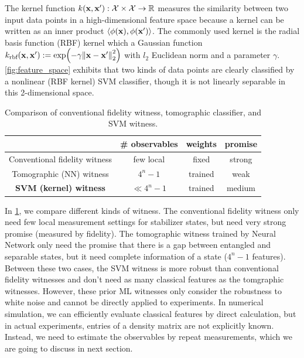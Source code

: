 \documentclass[
aps,
pra,
twocolumn,
floatfix,
]{revtex4-2}
\theoremstyle{plain}
\theoremstyle{definition}
\newcommand{\kernel}{k}
\begin{document}
The kernel function $\kernel(\vbx,\vbx'):\mathcal{X}\times \mathcal{X} \to \realnumber$ measures the similarity between two input data points in a high-dimensional feature space because a kernel can be written as an inner product $\langle \phi(\vb{x}),\phi(\vb{x}') \rangle$.
The commonly used kernel is the radial basis function (RBF) kernel which a Gaussian function
$\kernel_{\text{rbf}}(\vbx,\vbx') := \exp(-\gamma\norm{\vbx-\vbx'}^2_2)$ with $l_2$ Euclidean norm and a parameter $\gamma$.
\cref{fig:feature_space} exhibits that two kinds of data points are clearly classified by a nonlinear (RBF kernel) SVM classifier, though it is not linearly separable in this 2-dimensional space.



\begin{table}[!ht]
	\centering
	\begin{tabular}{c|c|c|c}
		& \# observables & weights & promise \\
		\hline
		Conventional fidelity  witness & few local & fixed & strong  \\  
		Tomographic (NN) witness & $4^n-1$ & trained & weak \\  
		\textbf{SVM (kernel) witness} &  $\ll 4^n-1$ & trained & medium \\  
		\hline
	\end{tabular}
	\caption{Comparison of conventional fidelity witness, tomographic classifier, and SVM witness.}
	\label{tab:comparison}
\end{table}
In \cref{tab:comparison}, we compare different kinds of witness. 
The conventional fidelity witness only need few local measurement settings for stabilizer states, but need very strong promise (measured by fidelity). 
The tomographic witness trained by Neural Network only need the promise that there is a gap between entangled and separable states, but it need complete information of a state ($4^n-1$ features).
Between these two cases, the SVM witness is more robust than conventional fidelity witnesses and don't need as many classical features as the tomgraphic witnesses.
However, these prior ML witnesses only consider the robustness to white noise and cannot be directly applied to experiments.
In numerical simulation, we can efficiently evaluate classical features by direct calculation, 
but in actual experiments, entries of a density matrix are not explicitly known.
Instead, we need to estimate the observables by repeat measurements, which we are going to discuss in next section.
\end{document}
